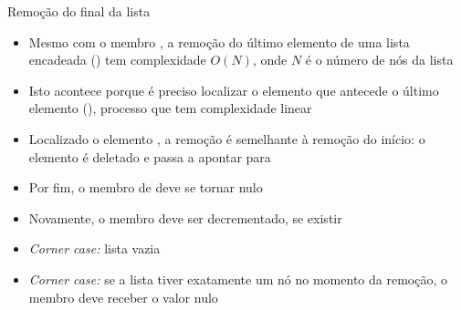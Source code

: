 \begin{frame}[fragile]{Remoção do final da lista}

    \begin{itemize}
        \item Mesmo com o membro , a remoção do último elemento de uma lista
            encadeada () tem complexidade $O(N)$, onde $N$ é o número de 
            nós da lista

        \item Isto acontece porque é preciso localizar o elemento que antecede o último elemento
        (), processo que tem complexidade linear

        \item Localizado o elemento , a remoção é semelhante à remoção do início:
        o elemento  é deletado e  passa a apontar para

        \item Por fim, o membro  de  deve se tornar nulo

        \item Novamente, o membro  deve ser decrementado, se existir

        \item \textit{Corner case:} lista vazia

        \item \textit{Corner case:} se a lista tiver exatamente um nó no momento da remoção,
            o membro  deve receber o valor nulo
    \end{itemize}

\end{frame}

